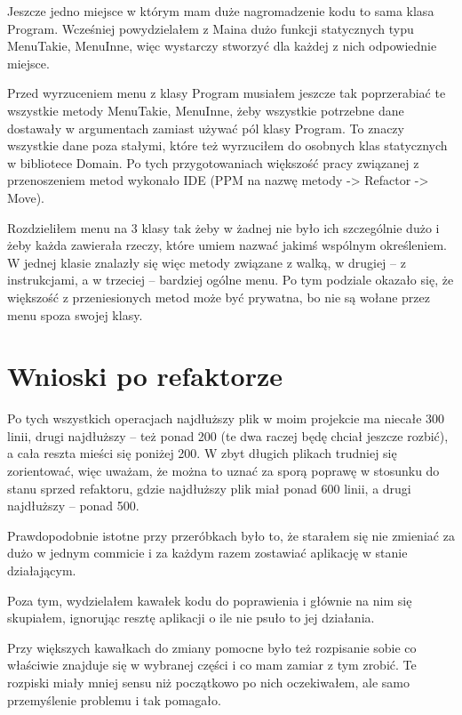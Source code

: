 \documentclass[10pt]{article}
\begin{document}
Jeszcze jedno miejsce w którym mam duże nagromadzenie kodu to sama klasa Program. Wcześniej powydzielałem z Maina dużo funkcji statycznych typu MenuTakie, MenuInne, więc wystarczy stworzyć dla każdej z nich odpowiednie miejsce.

Przed wyrzuceniem menu z klasy Program musiałem jeszcze tak poprzerabiać te wszystkie metody MenuTakie, MenuInne, żeby wszystkie potrzebne dane dostawały w argumentach zamiast używać pól klasy Program. To znaczy wszystkie dane poza stałymi, które też wyrzuciłem do osobnych klas statycznych w bibliotece Domain. Po tych przygotowaniach większość pracy związanej z przenoszeniem metod wykonało IDE (PPM na nazwę metody -> Refactor -> Move).

Rozdzieliłem menu na 3 klasy tak żeby w żadnej nie było ich szczególnie dużo i żeby każda zawierała rzeczy, które umiem nazwać jakimś wspólnym określeniem. W jednej klasie znalazły się więc metody związane z walką, w drugiej -- z instrukcjami, a w trzeciej -- bardziej ogólne menu. Po tym podziale okazało się, że większość z przeniesionych metod może być prywatna, bo nie są wołane przez menu spoza swojej klasy.

\section{Wnioski po refaktorze}
Po tych wszystkich operacjach najdłuższy plik w moim projekcie ma niecałe 300 linii, drugi najdłuższy -- też ponad 200 (te dwa raczej będę chciał jeszcze rozbić), a cała reszta mieści się poniżej 200. W zbyt długich plikach trudniej się zorientować, więc uważam, że można to uznać za sporą poprawę w stosunku do stanu sprzed refaktoru, gdzie najdłuższy plik miał ponad 600 linii, a drugi najdłuższy -- ponad 500.

Prawdopodobnie istotne przy przeróbkach było to, że starałem się nie zmieniać za dużo w jednym commicie i za każdym razem zostawiać aplikację w stanie działającym.

Poza tym, wydzielałem kawałek kodu do poprawienia i głównie na nim się skupiałem, ignorując resztę aplikacji o ile nie psuło to jej działania.

Przy większych kawałkach do zmiany pomocne było też rozpisanie sobie co właściwie znajduje się w wybranej części i co mam zamiar z tym zrobić. Te rozpiski miały mniej sensu niż początkowo po nich oczekiwałem, ale samo przemyślenie problemu i tak pomagało.
\end{document}
